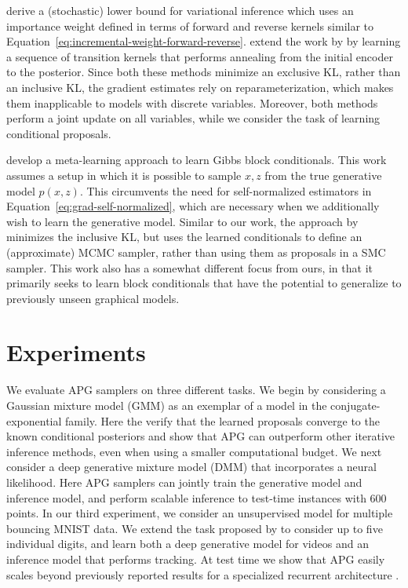 \documentclass{article}
\theoremstyle{definition}
\begin{document}
\citet{salimans2015markov} derive a (stochastic) lower bound for variational inference which uses an importance weight defined in terms of forward and reverse kernels similar to Equation~\ref{eq:incremental-weight-forward-reverse}.
\citet{huang2018improving} extend the work by \citet{salimans2015markov} by learning a sequence of transition kernels that performs annealing from the initial encoder to the posterior. 
Since both these methods minimize an exclusive KL, rather than an inclusive KL, the gradient estimates rely on reparameterization, which makes them inapplicable to models with discrete variables. 
Moreover, both methods perform a joint update on all variables, while we consider the task of learning conditional proposals.

\citet{wang2018meta} develop a meta-learning approach to learn Gibbs block conditionals. This work assumes a setup in which it is possible to sample $x, z$ from the true generative model $p(x,z)$. This circumvents the need for self-normalized estimators in Equation~\ref{eq:grad-self-normalized}, which are necessary when we additionally wish to learn the generative model. Similar to our work, the approach by \citet{wang2018meta} minimizes the inclusive KL, but uses the learned conditionals to define an (approximate) MCMC sampler, rather than using them as proposals in a SMC sampler. This work also has a somewhat different focus from ours, in that it primarily seeks to learn block conditionals that have the potential to generalize to previously unseen graphical models.


\vspace{-0.25em}
\section{Experiments}
\label{sec:experiments}

We evaluate APG samplers on three different tasks. 
We begin by considering a Gaussian mixture model (GMM) as an exemplar of a model in the conjugate-exponential family. 
Here the  verify that the learned proposals converge to the known conditional posteriors and show that APG can outperform other iterative inference methods, even when using a smaller computational budget. We next consider a deep generative mixture model (DMM) that incorporates a neural likelihood. Here APG samplers can jointly train the generative model and inference model, and perform scalable inference to test-time instances with 600 points. 
In our third experiment, we consider an unsupervised model for multiple bouncing MNIST data. We extend the task proposed by \citet{srivastava2015unsupervised} to consider up to five individual digits, and learn both a deep generative model for videos and an inference model that performs tracking. At test time we show that APG easily scales beyond previously reported results for a specialized recurrent architecture \cite{kosiorek2018sequential}. 
\end{document}
